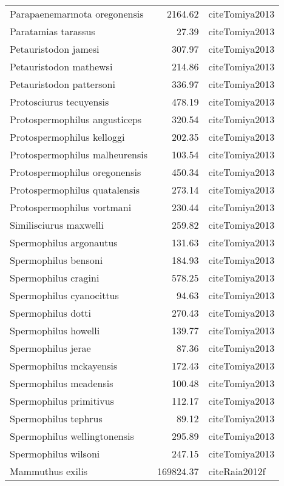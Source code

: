 \begin{table}[ht]
\begin{tabular}{lrl}
  Parapaenemarmota oregonensis & 2164.62 & cite{Tomiya2013} \\ 
  Paratamias tarassus & 27.39 & cite{Tomiya2013} \\ 
  Petauristodon jamesi & 307.97 & cite{Tomiya2013} \\ 
  Petauristodon mathewsi & 214.86 & cite{Tomiya2013} \\ 
  Petauristodon pattersoni & 336.97 & cite{Tomiya2013} \\ 
  Protosciurus tecuyensis & 478.19 & cite{Tomiya2013} \\ 
  Protospermophilus angusticeps & 320.54 & cite{Tomiya2013} \\ 
  Protospermophilus kelloggi & 202.35 & cite{Tomiya2013} \\ 
  Protospermophilus malheurensis & 103.54 & cite{Tomiya2013} \\ 
  Protospermophilus oregonensis & 450.34 & cite{Tomiya2013} \\ 
  Protospermophilus quatalensis & 273.14 & cite{Tomiya2013} \\ 
  Protospermophilus vortmani & 230.44 & cite{Tomiya2013} \\ 
  Similisciurus maxwelli & 259.82 & cite{Tomiya2013} \\ 
  Spermophilus argonautus & 131.63 & cite{Tomiya2013} \\ 
  Spermophilus bensoni & 184.93 & cite{Tomiya2013} \\ 
  Spermophilus cragini & 578.25 & cite{Tomiya2013} \\ 
  Spermophilus cyanocittus & 94.63 & cite{Tomiya2013} \\ 
  Spermophilus dotti & 270.43 & cite{Tomiya2013} \\ 
  Spermophilus howelli & 139.77 & cite{Tomiya2013} \\ 
  Spermophilus jerae & 87.36 & cite{Tomiya2013} \\ 
  Spermophilus mckayensis & 172.43 & cite{Tomiya2013} \\ 
  Spermophilus meadensis & 100.48 & cite{Tomiya2013} \\ 
  Spermophilus primitivus & 112.17 & cite{Tomiya2013} \\ 
  Spermophilus tephrus & 89.12 & cite{Tomiya2013} \\ 
  Spermophilus wellingtonensis & 295.89 & cite{Tomiya2013} \\ 
  Spermophilus wilsoni & 247.15 & cite{Tomiya2013} \\ 
  Mammuthus exilis & 169824.37 & cite{Raia2012f} \\ 

\end{tabular}
\end{table}
